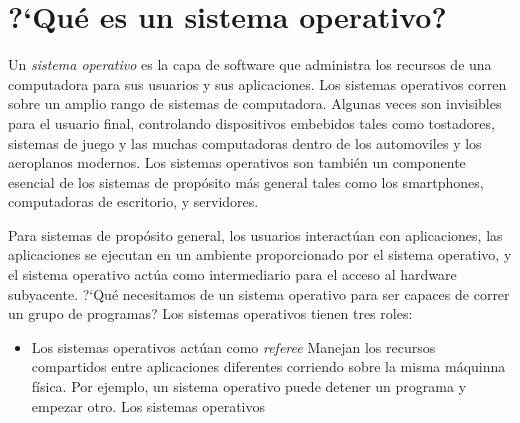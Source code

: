 \documentclass{article}
\begin{document}
\section{?`Qu\'e es un sistema operativo?}
Un {\it sistema operativo} es la capa de software que administra 
los recursos de una computadora para sus usuarios y sus aplicaciones. 
Los sistemas operativos co\-rren sobre un amplio rango de sistemas de 
computadora. Algunas veces son invisibles para el usuario final, 
controlando dispositivos embebidos tales como tostadores,  sistemas 
de juego y las muchas computadoras dentro de los automoviles y los 
aeroplanos modernos. Los sistemas operativos son tambi\'en un 
componente esencial de los sistemas de prop\'osito m\'as general 
tales como los smartphones, computadoras de escritorio, y servidores.

Para sistemas de prop\'osito general, los usuarios interact\'uan con 
aplicaciones, las aplicaciones se ejecutan en un ambiente proporcionado 
por el sistema operativo, y el sistema operativo act\'ua como 
intermediario para el acceso al hardware subyacente. ?`Qu\'e 
necesitamos de un sistema operativo para ser capaces de correr un 
grupo de programas? Los sistemas operativos tienen tres roles:
\begin{itemize}
\item Los sistemas operativos act\'uan como {\it referee} Manejan los 
recursos compartidos entre aplicaciones diferentes corriendo sobre la 
misma m\'aquinna f\'isica. Por ejemplo, un sistema operativo puede 
detener un programa y empezar otro. Los sistemas operativos
\end{itemize}
\end{document}
